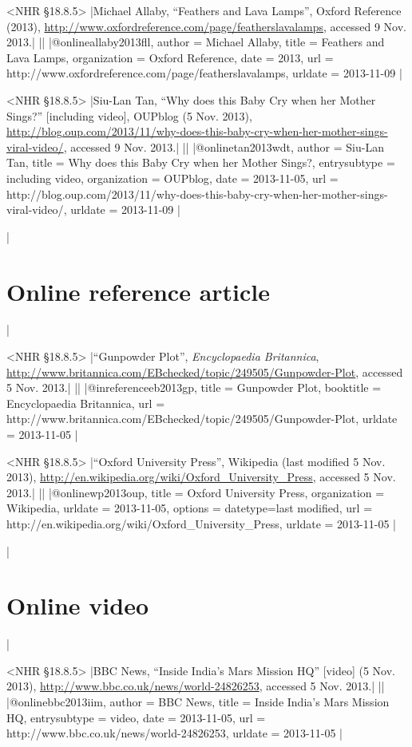 \documentclass[extrafontsizes,11pt,a4paper,oneside]{memoir}
\begin{document}
\bibexample<NHR \S18.8.5>
|Michael Allaby, \enquote{Feathers and Lava Lamps}, Oxford Reference (2013), \url{http://www.oxfordreference.com/page/featherslavalamps}, accessed 9 Nov. 2013.|%
||%
|@online{allaby2013fll,
  author = {Michael Allaby},
  title = {Feathers and Lava Lamps},
  organization = {Oxford Reference},
  date = {2013},
  url = {http://www.oxfordreference.com/page/featherslavalamps},
  urldate = {2013-11-09}
}|

\bibexample<NHR \S18.8.5>
|Siu-Lan Tan, \enquote{Why does this Baby Cry when her Mother Sings?} [including video], OUPblog (5 Nov. 2013), \url{http://blog.oup.com/2013/11/why-does-this-baby-cry-when-her-mother-sings-viral-video/}, accessed 9 Nov. 2013.|%
||%
|@online{tan2013wdt,
  author = {Siu-Lan Tan},
  title = {Why does this Baby Cry when her Mother Sings?},
  entrysubtype = {including video},
  organization = {OUPblog},
  date = {2013-11-05},
  url = {http://blog.oup.com/2013/11/why-does-this-baby-cry-when-her-mother-sings-viral-video/},
  urldate = {2013-11-09}
}|

\todoc|
\section{Online reference article}
|

\bibexample<NHR \S18.8.5>
|\enquote{Gunpowder Plot}, \emph{Encyclopaedia Britannica}, \url{http://www.britannica.com/EBchecked/topic/249505/Gunpowder-Plot}, accessed 5 Nov. 2013.|%
||%
|@inreference{eb2013gp,
  title = {Gunpowder Plot},
  booktitle = {Encyclopaedia Britannica},
  url = {http://www.britannica.com/EBchecked/topic/249505/Gunpowder-Plot},
  urldate = {2013-11-05}
}|

\bibexample<NHR \S18.8.5>
|\enquote{Oxford University Press}, Wikipedia (last modified 5 Nov. 2013), \url{http://en.wikipedia.org/wiki/Oxford_University_Press}, accessed 5 Nov. 2013.|%
||%
|@online{wp2013oup,
  title = {Oxford University Press},
  organization = {Wikipedia},
  urldate = {2013-11-05},
  options = {datetype={last modified}},
  url = {http://en.wikipedia.org/wiki/Oxford_University_Press},
  urldate = {2013-11-05}
}|

\todoc|
\section{Online video}
|

\bibexample<NHR \S18.8.5>
|BBC News, \enquote{Inside India's Mars Mission HQ} [video] (5 Nov. 2013), \url{http://www.bbc.co.uk/news/world-24826253}, accessed 5 Nov. 2013.|%
||%
|@online{bbc2013iim,
  author = {{BBC News}},
  title = {Inside India's Mars Mission HQ},
  entrysubtype = {video},
  date = {2013-11-05},
  url = {http://www.bbc.co.uk/news/world-24826253},
  urldate = {2013-11-05}
}|
\end{document}
